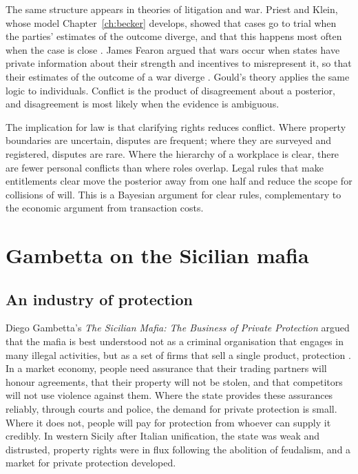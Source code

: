 The same structure appears in theories of litigation and war. Priest and Klein, whose model Chapter~\ref{ch:becker} develops, showed that cases go to trial when the parties' estimates of the outcome diverge, and that this happens most often when the case is close \citep{priest_klein1984}. James Fearon argued that wars occur when states have private information about their strength and incentives to misrepresent it, so that their estimates of the outcome of a war diverge \citep{fearon1995}. Gould's theory applies the same logic to individuals. Conflict is the product of disagreement about a posterior, and disagreement is most likely when the evidence is ambiguous.

The implication for law is that clarifying rights reduces conflict. Where property boundaries are uncertain, disputes are frequent; where they are surveyed and registered, disputes are rare. Where the hierarchy of a workplace is clear, there are fewer personal conflicts than where roles overlap. Legal rules that make entitlements clear move the posterior away from one half and reduce the scope for collisions of will. This is a Bayesian argument for clear rules, complementary to the economic argument from transaction costs.

\section{Gambetta on the Sicilian mafia}

\subsection{An industry of protection}

Diego Gambetta's \emph{The Sicilian Mafia: The Business of Private Protection} argued that the mafia is best understood not as a criminal organisation that engages in many illegal activities, but as a set of firms that sell a single product, protection \citep{gambetta1993}. In a market economy, people need assurance that their trading partners will honour agreements, that their property will not be stolen, and that competitors will not use violence against them. Where the state provides these assurances reliably, through courts and police, the demand for private protection is small. Where it does not, people will pay for protection from whoever can supply it credibly. In western Sicily after Italian unification, the state was weak and distrusted, property rights were in flux following the abolition of feudalism, and a market for private protection developed.

